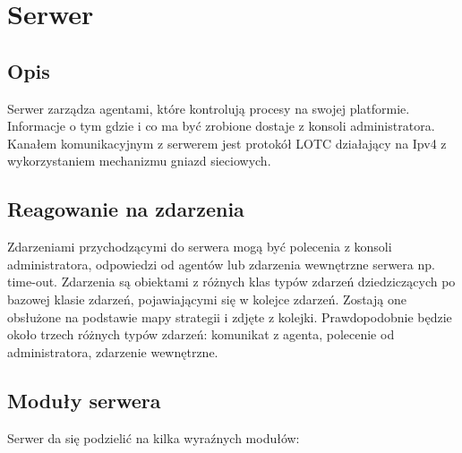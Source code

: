 \documentclass[10pt,a4paper]{article}
\begin{document}
    \section{Serwer}
			
		\subsection{Opis}
			Serwer zarządza agentami, które kontrolują procesy na swojej platformie. Informacje o tym gdzie i co ma być zrobione dostaje z konsoli administratora. Kanałem komunikacyjnym z serwerem jest protokół LOTC działający na Ipv4 z wykorzystaniem mechanizmu gniazd sieciowych. \\
		
		\subsection{Reagowanie na zdarzenia}
			Zdarzeniami przychodzącymi do serwera mogą być polecenia z konsoli administratora, odpowiedzi od agentów lub zdarzenia wewnętrzne serwera np. time-out. Zdarzenia są obiektami z różnych klas typów zdarzeń dziedziczących po bazowej klasie zdarzeń, pojawiającymi się w kolejce zdarzeń. Zostają one obsłużone na podstawie mapy strategii i zdjęte z kolejki. Prawdopodobnie będzie około trzech różnych typów zdarzeń: komunikat z agenta, polecenie od administratora, zdarzenie wewnętrzne.
		
		\subsection{Moduły serwera}
			Serwer da się podzielić na kilka wyraźnych modułów: \\
			
\end{document}
